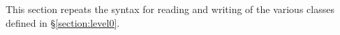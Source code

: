 \label{object-syntax-summary}
\begin{optDefinition}
\raggedbottom
%
This section repeats the syntax for reading and writing of the various classes
defined in \S\ref{section:level0}.


\end{optDefinition}
